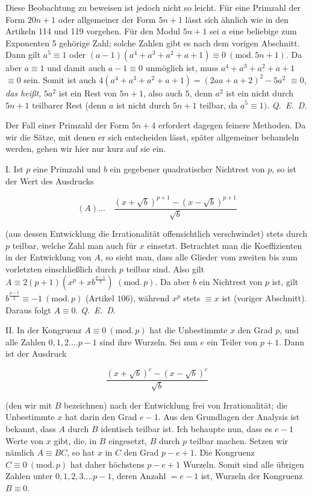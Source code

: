 Diese Beobachtung zu beweisen ist jedoch nicht so leicht. Für eine Primzahl der Form $20n+1$ oder allgemeiner der Form $5n+1$ lässt sich ähnlich wie in den Artikeln 114 und 119 vorgehen. Für den Modul $5n+1$ sei $a$ eine beliebige zum Exponenten 5 gehörige Zahl; solche Zahlen gibt es nach dem vorigen Abschnitt. Dann gilt $a^5\equiv1$ oder $(a-1)(a^4+a^3+a^2+a+1)\equiv0\ (\mathrm{mod.}\,5n+1)$. Da aber $a\equiv1$ und damit auch $a-1\equiv0$ unmöglich ist, muss $a^4+a^3+a^2+a+1$ $\equiv0$ sein. Somit ist auch $4(a^4+a^3+a^2+a+1)=(2aa+a+2)^2-5a^2$ $\equiv0$, \textit{das heißt,} $5a^2$ ist ein Rest von $5n+1$, also auch $5$, denn $a^2$ ist ein nicht durch $5n+1$ teilbarer Rest (denn $a$ ist nicht durch $5n+1$ teilbar, da $a^5\equiv1)$. \mbox{\textit{Q. E. D.}}

Der Fall einer Primzahl der Form $5n+4$ erfordert dagegen feinere Methoden. Da wir die Sätze, mit denen er sich entscheiden lässt, später allgemeiner behandeln werden, gehen wir hier nur kurz auf sie ein.

I. Ist $p$ eine Primzahl und $b$ ein gegebener quadratischer Nichtrest von $p$, so ist der Wert des Ausdrucks

\[
(A)\ldots\quad\frac{(x+\surd b)^{p+1}-(x-\surd b)^{p+1}}{\surd b}
\]

(aus dessen Entwicklung die Irrationalität offensichtlich verschwindet) stets durch $p$ teilbar, welche Zahl man auch für $x$ einsetzt. Betrachtet man die Koeffizienten in der Entwicklung von $A$, so sieht man, dass alle Glieder vom zweiten bis zum vorletzten einschließlich durch $p$ teilbar sind. Also gilt $A\equiv2(p+1)(x^p+xb^{\frac{p-1}{2}})$ $(\mathrm{mod.}\,p)$. Da aber $b$ ein Nichtrest von $p$ ist, gilt $b^{\frac{p-1}{2}}\equiv-1\ (\mathrm{mod.}\,p)$ (Artikel $106$), während $x^p$ stets $\equiv x$ ist (voriger Abschnitt). Daraus folgt $A\equiv0$. \mbox{\textit{Q. E. D.}}

II. In der Kongruenz $A\equiv0\ (\mathrm{mod.}\,p)$ hat die Unbestimmte $x$ den Grad $p$, und alle Zahlen $0,1,2....p-1$ sind ihre Wurzeln. Sei nun $e$ ein Teiler von $p+1$. Dann ist der Ausdruck

\[
\frac{(x+\surd b)^e-(x-\surd b)^e}{\surd b}
\]

(den wir mit $B$ bezeichnen) nach der Entwicklung frei von Irrationalität; die Unbestimmte $x$ hat darin den Grad $e-1$. Aus den Grundlagen der Analysis ist bekannt, dass $A$ durch $B$ identisch teilbar ist. Ich behaupte nun, dass es $e-1$ Werte von $x$ gibt, die, in $B$ eingesetzt, $B$ durch $p$ teilbar machen. Setzen wir nämlich $A\equiv BC$, so hat $x$ in $C$ den Grad $p-e+1$. Die Kongruenz $C\equiv0\ (\mathrm{mod.}\,p)$ hat daher höchstens $p-e+1$ Wurzeln. Somit sind alle übrigen Zahlen unter $0,1,2,3....p-1$, deren Anzahl $=e-1$ ist, Wurzeln der Kongruenz $B\equiv0$.

